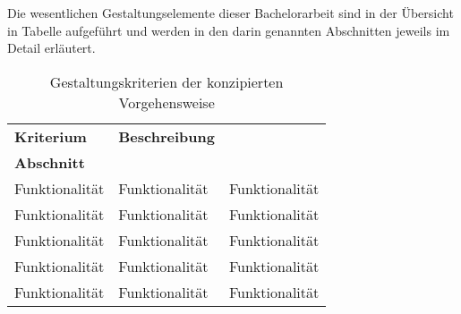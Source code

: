 
Die wesentlichen Gestaltungselemente dieser Bachelorarbeit sind in der Übersicht in Tabelle \todo{} aufgeführt und werden in den darin genannten Abschnitten jeweils im Detail erläutert.

\begin{table}[H]
	\centering
	\begin{tabularx}{\textwidth}{l X X} 
		\toprule
		\textbf{Kriterium}  &   
		\textbf{Beschreibung}  \\ 
		\textbf{Abschnitt}  \\ 
		\toprule
		Funktionalität &   
		Funktionalität &
		Funktionalität      \\  \cmidrule(r){1-1} \cmidrule(r){2-2} \cmidrule(r){3-3}
		
		Funktionalität &   
		Funktionalität &
		Funktionalität      \\  \cmidrule(r){1-1} \cmidrule(r){2-2} \cmidrule(r){3-3}
		
		Funktionalität &   
		Funktionalität &
		Funktionalität      \\  \cmidrule(r){1-1} \cmidrule(r){2-2} \cmidrule(r){3-3}
		
		Funktionalität &   
		Funktionalität &
		Funktionalität      \\  \cmidrule(r){1-1} \cmidrule(r){2-2} \cmidrule(r){3-3}
		
		Funktionalität &   
		Funktionalität &
		Funktionalität      \\  \bottomrule
	\end{tabularx}
	\caption[Gestaltungskriterien der konzipierten Vorgehensweise]
    {Gestaltungskriterien der konzipierten Vorgehensweise}
    \label{tab:Gestaltungskriterien der konzipierten Vorgehensweise}
\end{table}
